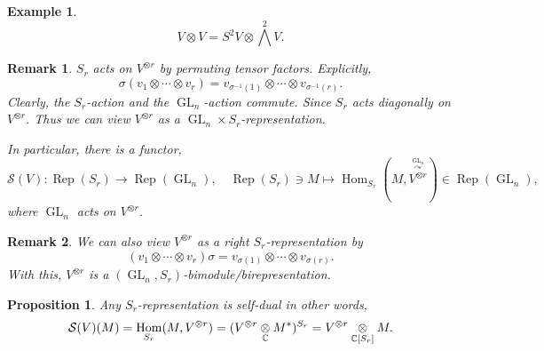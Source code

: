 \documentclass[10pt]{article}
\newtheorem{proposition}{Proposition}[section]
\newtheorem{remark}{Remark}[section]
\newtheorem{example}{Example}[section]
\numberwithin{equation}{theorem}
\DeclareMathOperator{\GL}{GL}
\DeclareMathOperator{\Rep}{Rep}
\DeclareMathOperator{\Hom}{Hom}
\newcommand{\C}[0]{\mathbb{C}}
\newcommand{\tens}[1]{%
  \mathbin{\mathop{\otimes}\displaylimits_{#1}}%
}
\begin{document}
\begin{example}
  \begin{equation*}
    V\otimes V = S^2V\otimes \bigwedge^2V.
  \end{equation*}
\end{example}

\begin{remark}
  $S_r$ acts on $V^{\otimes r}$ by permuting tensor factors. Explicitly,
  \begin{equation*}
    \sigma(v_1\otimes \cdots \otimes v_r) = v_{\sigma^{-1}(1)}\otimes \cdots \otimes v_{\sigma^{-1}(r)}.
  \end{equation*}
  Clearly, the $S_r$-action and the $\GL_n$-action commute. Since $S_r$ acts diagonally on $V^{\otimes r}$. Thus we can view $V^{\otimes r}$ as a $\GL_n\times S_r$-representation.\\
  \par In particular, there is a functor, 
  \begin{equation*}
    \mathcal{S}(V):\Rep(S_r)\to\Rep(\GL_n),\quad \Rep(S_r)\ni M\mapsto \Hom_{S_r}(M,\stackrel{\stackrel{\GL_n}{\curvearrowright}}{V^{\otimes r}})\in \Rep(\GL_n),
  \end{equation*}
  where $\GL_n$ acts on $V^{\otimes r}$.
\end{remark}
\begin{remark}
  We can also view $V^{\otimes r}$ as a right $S_r$-representation by 
  \begin{equation*}
    (v_1\otimes \cdots \otimes v_r) \sigma = v_{\sigma(1)}\otimes\cdots\otimes v_{\sigma(r)}.
  \end{equation*}
  With this, $V^{\otimes r}$ is a $(\GL_n,S_r)$-bimodule/birepresentation.
\end{remark}

\begin{proposition}
  Any $S_r$-representation is self-dual in other words,
  \begin{equation*}
    \mathcal{S}(V)(M) = \Hom_{S_r}(M,V^{\otimes r}) = (V^{\otimes r}\tens{\C}M^*)^{S_r} = V^{\otimes r}\tens{\C[S_r]}M.
  \end{equation*}
\end{proposition}
\end{document}
